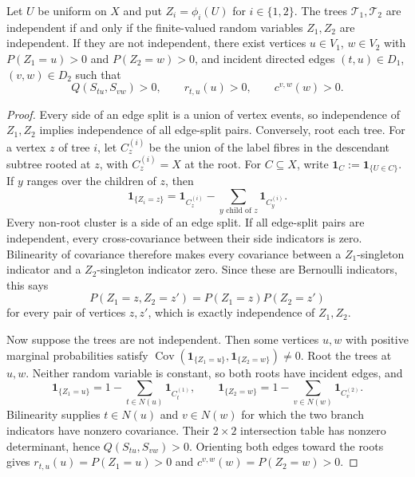 \documentclass[12pt]{article}
\begin{document}
\begin{lemma}
\label{lem:vertex-side-bridge}
Let $U$ be uniform on $X$ and put $Z_i=\phi_i(U)$ for $i\in\{1,2\}$.
The trees $\mathcal T_1,\mathcal T_2$ are independent if and only if the
finite-valued random variables $Z_1,Z_2$ are independent.  If they are not
independent, there exist vertices $u\in V_1$, $w\in V_2$ with
$P(Z_1=u)>0$ and $P(Z_2=w)>0$, and
incident directed edges $(t,u)\in D_1$, $(v,w)\in D_2$ such that
\begin{equation}\label{eq:display-049}
Q(S_{tu},S_{vw})>0,
\qquad r_{t,u}(u)>0,
\qquad c^{v,w}(w)>0.
\end{equation}
\end{lemma}

\begin{proof}
Every side of an edge split is a union of vertex events, so independence of
$Z_1,Z_2$ implies independence of all edge-split pairs.  Conversely, root
each tree.  For a vertex $z$ of tree $i$, let $C_z^{(i)}$ be the union of
the label fibres in the descendant subtree rooted at $z$, with
$C_z^{(i)}=X$ at the root.  For $C\subseteq X$, write
$\mathbf 1_C:=\mathbf 1_{\{U\in C\}}$.  If $y$ ranges over the
children of $z$, then
\begin{equation}\label{eq:display-050}
\mathbf 1_{\{Z_i=z\}}=\mathbf 1_{C_z^{(i)}}
-\sum_{y\text{ child of }z}\mathbf 1_{C_y^{(i)}}.
\end{equation}
Every non-root cluster is a side of an edge split.  If all edge-split pairs
are independent, every cross-covariance between their side indicators is
zero.  Bilinearity of covariance therefore makes every covariance between a
$Z_1$-singleton indicator and a $Z_2$-singleton indicator zero.  Since these
are Bernoulli indicators, this says
\begin{equation}\label{eq:display-051}
P(Z_1=z,Z_2=z')=P(Z_1=z)P(Z_2=z')
\end{equation}
for every pair of vertices $z,z'$, which is exactly independence of
$Z_1,Z_2$.

Now suppose the trees are not independent.  Then some vertices $u,w$ with
positive marginal probabilities satisfy
$\operatorname{Cov}(\mathbf 1_{\{Z_1=u\}},
\mathbf 1_{\{Z_2=w\}})\ne0$.  Root the trees at $u,w$.  Neither random
variable is constant, so both roots have incident edges, and
\begin{equation}\label{eq:display-052}
\mathbf 1_{\{Z_1=u\}}=1-\sum_{t\in N(u)}\mathbf 1_{C_t^{(1)}},
\qquad
\mathbf 1_{\{Z_2=w\}}=1-\sum_{v\in N(w)}\mathbf 1_{C_v^{(2)}}.
\end{equation}
Bilinearity supplies $t\in N(u)$ and $v\in N(w)$ for which the two branch
indicators have nonzero covariance.  Their $2\times2$ intersection table has
nonzero determinant, hence $Q(S_{tu},S_{vw})>0$.  Orienting both edges toward
the roots gives
$r_{t,u}(u)=P(Z_1=u)>0$ and $c^{v,w}(w)=P(Z_2=w)>0$.
\end{proof}
\end{document}
